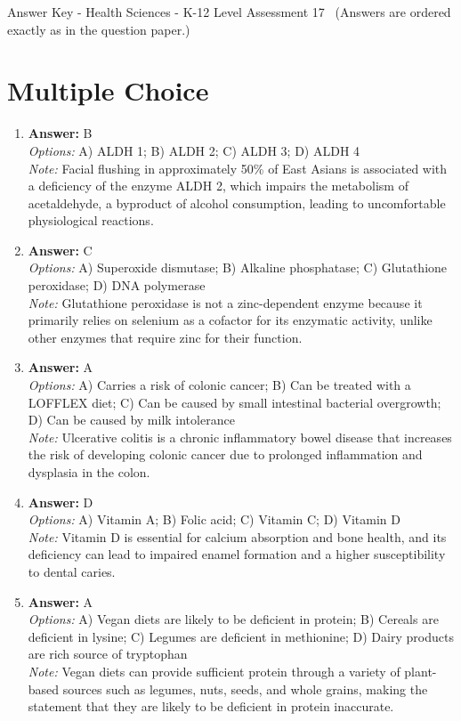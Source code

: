 \documentclass[12pt]{article}
\begin{document}
\begin{center}
Answer Key - Health Sciences - K-12 Level Assessment 17 \
\small (Answers are ordered exactly as in the question paper.)
\end{center}

\section*{Multiple Choice}
\begin{enumerate}[label=\arabic*.]
\item \textbf{Answer:} B
\\ \textit{Options:} A) ALDH 1; B) ALDH 2; C) ALDH 3; D) ALDH 4
\\ \textit{Note:} Facial flushing in approximately 50\% of East Asians is associated with a deficiency of the enzyme ALDH 2, which impairs the metabolism of acetaldehyde, a byproduct of alcohol consumption, leading to uncomfortable physiological reactions.
\item \textbf{Answer:} C
\\ \textit{Options:} A) Superoxide dismutase; B) Alkaline phosphatase; C) Glutathione peroxidase; D) DNA polymerase
\\ \textit{Note:} Glutathione peroxidase is not a zinc-dependent enzyme because it primarily relies on selenium as a cofactor for its enzymatic activity, unlike other enzymes that require zinc for their function.
\item \textbf{Answer:} A
\\ \textit{Options:} A) Carries a risk of colonic cancer; B) Can be treated with a LOFFLEX diet; C) Can be caused by small intestinal bacterial overgrowth; D) Can be caused by milk intolerance
\\ \textit{Note:} Ulcerative colitis is a chronic inflammatory bowel disease that increases the risk of developing colonic cancer due to prolonged inflammation and dysplasia in the colon.
\item \textbf{Answer:} D
\\ \textit{Options:} A) Vitamin A; B) Folic acid; C) Vitamin C; D) Vitamin D
\\ \textit{Note:} Vitamin D is essential for calcium absorption and bone health, and its deficiency can lead to impaired enamel formation and a higher susceptibility to dental caries.
\item \textbf{Answer:} A
\\ \textit{Options:} A) Vegan diets are likely to be deficient in protein; B) Cereals are deficient in lysine; C) Legumes are deficient in methionine; D) Dairy products are rich source of tryptophan
\\ \textit{Note:} Vegan diets can provide sufficient protein through a variety of plant-based sources such as legumes, nuts, seeds, and whole grains, making the statement that they are likely to be deficient in protein inaccurate.
\end{enumerate}
\end{document}
